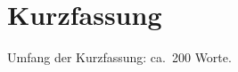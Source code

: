 \documentclass[type=internship,theme=default,language=german,titlelanguage=german,smartquotes=true,aiusage=detailed]{hgbthesis}
\begin{document}
\begin{aiusage}
\end{aiusage}

\frontmatter                                       %

\maketitle
\tableofcontents


\chapter{Kurzfassung}

Umfang der Kurzfassung: ca.\ 200 Worte.
\end{document}
